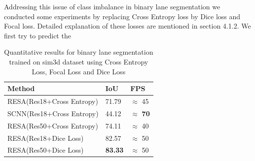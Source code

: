     Addressing this issue of class imbalance in binary lane segmentation we conducted some experiments by replacing Cross Entropy loss by Dice loss and Focal loss. Detailed explanation of these losses are mentioned in section 4.1.2. We first try to predict the 
    
     \begin{table}[h!]
    \caption{Quantitative results for binary lane segmentation trained on sim3d \cite{} dataset using Cross Entropy Loss, Focal Loss and Dice Loss}
    \centering
    \begin{tabular}{|l|l|l|}
    \hline
        \textbf{Method} & \textbf{IoU} & \textbf{FPS} \\ \hline
        RESA(Res18+Cross Entropy) & 71.79 & $\approx$ 45 \\ \hline
        SCNN(Res18+Cross Entropy) & 44.12 & $\approx$ \textbf{70}  \\ \hline
        RESA(Res50+Cross Entropy) & 74.11 & $\approx$ 40  \\ \hline

        RESA(Res18+Dice Loss) & 82.57 & $\approx$ 50 \\\hline
        RESA(Res50+Dice Loss) & \textbf{83.33} & $\approx$ 50 \\\hline
    \end{tabular}
\end{table}
    

